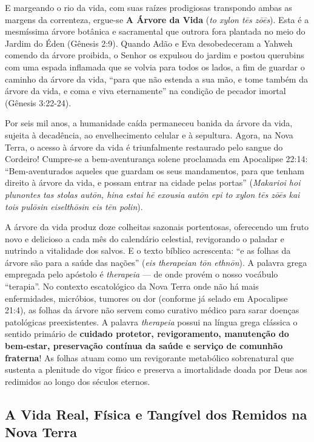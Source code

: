 \documentclass[11pt,a4paper,openany]{book}
\begin{document}
E margeando o rio da vida, com suas raízes prodigiosas transpondo ambas as margens da correnteza, ergue-se \textbf{A Árvore da Vida} (\textit{to xylon tēs zōēs}).
Esta é a mesmíssima árvore botânica e sacramental que outrora fora plantada no meio do Jardim do Éden (Gênesis 2:9). Quando Adão e Eva desobedeceram a Yahweh comendo da árvore proibida, o Senhor os expulsou do jardim e postou querubins com uma espada inflamada que se volvia para todos os lados, a fim de guardar o caminho da árvore da vida, ``para que não estenda a sua mão, e tome também da árvore da vida, e coma e viva eternamente'' na condição de pecador imortal (Gênesis 3:22-24).

Por seis mil anos, a humanidade caída permaneceu banida da árvore da vida, sujeita à decadência, ao envelhecimento celular e à sepultura.
Agora, na Nova Terra, o acesso à árvore da vida é triunfalmente restaurado pelo sangue do Cordeiro! Cumpre-se a bem-aventurança solene proclamada em Apocalipse 22:14:
``Bem-aventurados aqueles que guardam os seus mandamentos, para que tenham direito à árvore da vida, e possam entrar na cidade pelas portas'' (\textit{Makarioi hoi plunontes tas stolas autōn, hina estai hē exousia autōn epi to xylon tēs zōēs kai tois pulōsin eiselthōsin eis tēn polin}).

A árvore da vida produz doze colheitas sazonais portentosas, oferecendo um fruto novo e delicioso a cada mês do calendário celestial, revigorando o paladar e nutrindo a vitalidade dos salvos.
E o texto bíblico acrescenta: ``e as folhas da árvore são para a saúde das nações'' (\textit{eis therapeian tōn ethnōn}).
A palavra grega empregada pelo apóstolo é \textit{therapeia} — de onde provém o nosso vocábulo ``terapia''.
No contexto escatológico da Nova Terra onde não há mais enfermidades, micróbios, tumores ou dor (conforme já selado em Apocalipse 21:4), as folhas da árvore não servem como curativo médico para sarar doenças patológicas preexistentes. A palavra \textit{therapeia} possui na língua grega clássica o sentido primário de \textbf{cuidado protetor, revigoramento, manutenção do bem-estar, preservação contínua da saúde e serviço de comunhão fraterna}! As folhas atuam como um revigorante metabólico sobrenatural que sustenta a plenitude do vigor físico e preserva a imortalidade doada por Deus aos redimidos ao longo dos séculos eternos.



\subsection{A Vida Real, Física e Tangível dos Remidos na Nova Terra}
\end{document}

